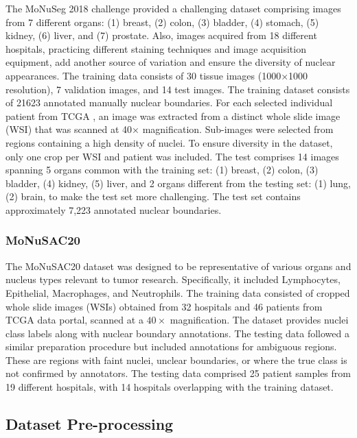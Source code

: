 \documentclass{article}
\begin{document}
The MoNuSeg 2018 challenge provided a challenging dataset \cite{kumar2019multi} comprising images from 7 different organs: (1) breast, (2) colon, (3) bladder, (4) stomach, (5) kidney, (6) liver, and (7) prostate. Also, images acquired from 18 different hospitals, practicing different staining techniques and image acquisition equipment, add another source of variation and ensure the diversity of nuclear appearances. The training data consists of 30 tissue images (1000×1000 resolution), 7 validation images, and 14 test images. The training dataset consists of 21623 annotated manually nuclear boundaries. For each selected individual patient from TCGA \cite{tcga}, an image was extracted from a distinct whole slide image (WSI) that was scanned at 40× magnification. Sub-images were selected from regions containing a high density of nuclei. To ensure diversity in the dataset, only one crop per WSI and patient was included. The test comprises 14 images spanning 5 organs common with the training set: (1) breast, (2) colon, (3) bladder, (4) kidney, (5) liver, and 2 organs different from the testing set: (1) lung, (2) brain, to make the test set more challenging. The test set contains approximately 7,223 annotated nuclear boundaries.

\subsubsection{MoNuSAC20}

The MoNuSAC20 dataset \cite{verma2021monusac2020} was designed to be representative of various organs and nucleus types relevant to tumor research. Specifically, it included Lymphocytes, Epithelial, Macrophages, and Neutrophils. The training data consisted of cropped whole slide images (WSIs) obtained from 32 hospitals and 46 patients from TCGA \cite{tcga} data portal, scanned at a \(40\times\) magnification. The dataset provides nuclei class labels along with nuclear boundary annotations. The testing data followed a similar preparation procedure but included annotations for ambiguous regions. These are regions with faint nuclei, unclear boundaries, or where the true class is not confirmed by annotators. The testing data comprised 25 patient samples from 19 different hospitals, with 14 hospitals overlapping with the training dataset.

\subsection{Dataset Pre-processing}\label{Dataset Pre-processing}
\end{document}
